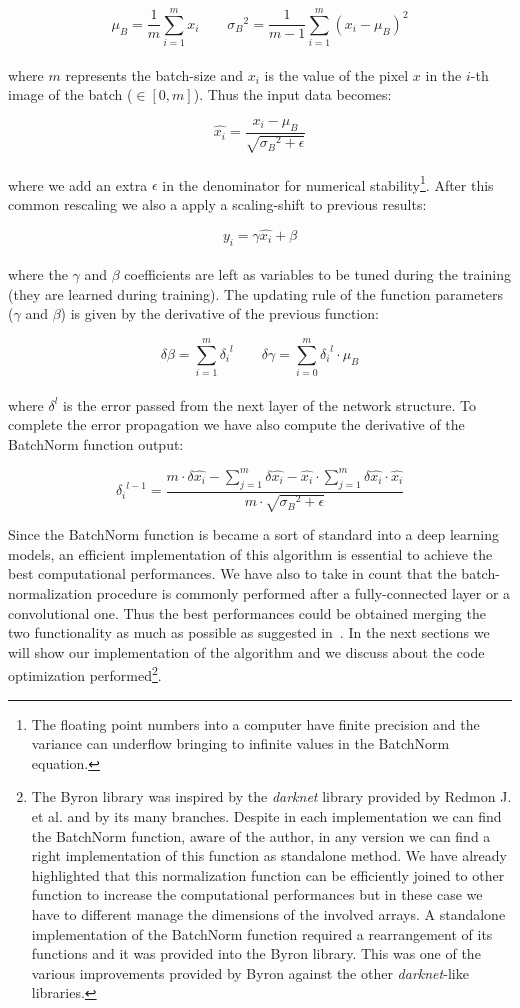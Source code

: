 \documentclass{standalone}
\begin{document}
$$
\mu_B = \frac{1}{m}\sum_{i=1}^{m}x_i \quad\quad {\sigma_B}^2 = \frac{1}{m-1}\sum_{i=1}^{m}(x_i - \mu_B)^2
$$
\\
where $m$ represents the batch-size and $x_i$ is the value of the pixel $x$ in the $i$-th image of the batch ($\in[0, m]$).
Thus the input data becomes:

$$
\hat{x_i} = \frac{x_i - \mu_B}{\sqrt{{\sigma_B}^2 + \epsilon}}
$$
\\
where we add an extra $\epsilon$ in the denominator for numerical stability\footnote{
  The floating point numbers into a computer have finite precision and the variance can underflow bringing to infinite values in the BatchNorm equation.
}.
After this common rescaling we also a apply a scaling-shift to previous results:

$$
y_i = \gamma\hat{x_i} + \beta
$$
\\
where the $\gamma$ and $\beta$ coefficients are left as variables to be tuned during the training (they are learned during training).
The updating rule of the function parameters ($\gamma$ and $\beta$) is given by the derivative of the previous function:

$$
\delta\beta = \sum_{i=1}^{m}{\delta_i}^l \quad\quad \delta\gamma = \sum_{i=0}^{m} {\delta_i}^l \cdot \mu_B
$$
\\
where $\delta^l$ is the error passed from the next layer of the network structure.
To complete the error propagation we have also compute the derivative of the BatchNorm function output:

$$
{\delta_i}^{l-1} = \frac{{m}\cdot \delta\hat{x_i} - \sum_{j=1}^{m}\delta\hat{x_i} - \hat{x_i} \cdot \sum_{j=1}^{m} \delta\hat{x_i} \cdot \hat{x_i}}{m \cdot \sqrt{{\sigma_B}^2 + \epsilon} }
$$

Since the BatchNorm function is became a sort of standard into a deep learning models, an efficient implementation of this algorithm is essential to achieve the best computational performances.
We have also to take in count that the batch-normalization procedure is commonly performed after a fully-connected layer or a convolutional one.
Thus the best performances could be obtained merging the two functionality as much as possible as suggested in~\cite{AlexeyAB}.
In the next sections we will show our implementation of the algorithm and we discuss about the code optimization performed\footnote{
  The Byron library was inspired by the \emph{darknet} library provided by Redmon J. et al. and by its many branches.
  Despite in each implementation we can find the BatchNorm function, aware of the author, in any version we can find a right implementation of this function as standalone method.
  We have already highlighted that this normalization function can be efficiently joined to other function to increase the computational performances but in these case we have to different manage the dimensions of the involved arrays.
  A standalone implementation of the BatchNorm function required a rearrangement of its functions and it was provided into the Byron library.
  This was one of the various improvements provided by Byron against the other \emph{darknet}-like libraries.
}.
\end{document}
